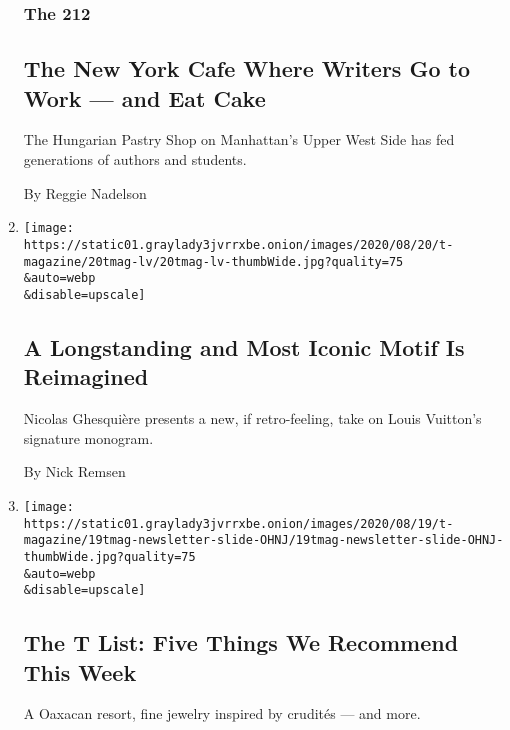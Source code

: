 \begin{enumerate}
  \hypertarget{the-212}{%
  \subsubsection{The 212}\label{the-212}}

  \hypertarget{the-new-york-cafe-where-writers-go-to-work--and-eat-cake}{%
  \subsection{The New York Cafe Where Writers Go to Work --- and Eat
  Cake}\label{the-new-york-cafe-where-writers-go-to-work--and-eat-cake}}

  The Hungarian Pastry Shop on Manhattan's Upper West Side has fed
  generations of authors and students.

  By Reggie Nadelson
\item
  \href{/2020/08/20/t-magazine/louis-vuitton-speedy-bag.html}{}

  \texttt{[image: https://static01.graylady3jvrrxbe.onion/images/2020/08/20/t-magazine/20tmag-lv/20tmag-lv-thumbWide.jpg?quality=75\\\&auto=webp\\\&disable=upscale]}

  \hypertarget{a-longstanding-and-most-iconic-motif-is-reimagined}{%
  \subsection{A Longstanding and Most Iconic Motif Is
  Reimagined}\label{a-longstanding-and-most-iconic-motif-is-reimagined}}

  Nicolas Ghesquière presents a new, if retro-feeling, take on Louis
  Vuitton's signature monogram.

  By Nick Remsen
\item
  \href{/2020/08/20/t-magazine/monte-uzulu-vivanterre-emme-parsons.html}{}

  \texttt{[image: https://static01.graylady3jvrrxbe.onion/images/2020/08/19/t-magazine/19tmag-newsletter-slide-OHNJ/19tmag-newsletter-slide-OHNJ-thumbWide.jpg?quality=75\\\&auto=webp\\\&disable=upscale]}

  \hypertarget{the-t-list-five-things-we-recommend-this-week-2}{%
  \subsection{The T List: Five Things We Recommend This
  Week}\label{the-t-list-five-things-we-recommend-this-week-2}}

  A Oaxacan resort, fine jewelry inspired by crudités --- and more.
\end{enumerate}

